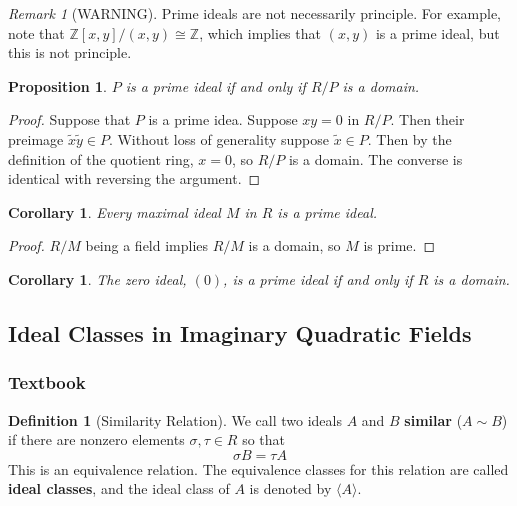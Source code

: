 \documentclass[12pt]{article}
\newtheorem{cor}[thm]{Corollary}
\newtheorem{prop}[thm]{Proposition}
\theoremstyle{definition}
\newtheorem{defn}[thm]{Definition}
\theoremstyle{remark}
\newtheorem{rmk}[thm]{Remark}
\numberwithin{equation}{section}
\newcommand\Z{\mathbb Z}    %
\newcommand\B[1]{\textbf{ #1}}
\begin{document}
\begin{rmk}[WARNING]
        Prime ideals are not necessarily principle. For example, note that $\Z[x,y]/(x,y) \cong \Z$, which implies that $(x,y)$ is a prime ideal, but this is not principle.
\end{rmk}

\vspace{15pt}



\begin{prop}
        $P$ is a prime ideal if and only if $R/P$ is a domain.
\end{prop}
\begin{proof}
        Suppose that $P$ is a prime idea. Suppose $xy = 0$ in $R/P$. Then their preimage $\widetilde{x}\widetilde{y} \in P$. Without loss of generality suppose $\widetilde{x} \in P$. Then by the definition of the quotient ring, $x = 0$, so $R/P$ is a domain. The converse is identical with reversing the argument.
\end{proof}

\vspace{15pt}


\begin{cor}
        Every maximal ideal $M$ in $R$ is a prime ideal.
\end{cor}
\begin{proof}
        $R/M$ being a field implies $R/M$ is a domain, so $M$ is prime.
\end{proof}

\vspace{15pt}

\begin{cor}
        The zero ideal, $(0)$, is a prime ideal if and only if $R$ is a domain.
\end{cor}

\vspace{15pt}







\subsection{Ideal Classes in Imaginary Quadratic Fields}


\subsubsection{Textbook}

\begin{defn}[Similarity Relation]
        We call two ideals $A$ and $B$ \B{similar} ($A\sim B$) if there are nonzero elements $\sigma,\tau \in R$ so that \begin{equation}
                \sigma B = \tau A
        \end{equation}
        This is an equivalence relation. The equivalence classes for this relation are called \B{ideal classes}, and the ideal class of $A$ is denoted by $\langle A \rangle$.
\end{defn}
\end{document}
